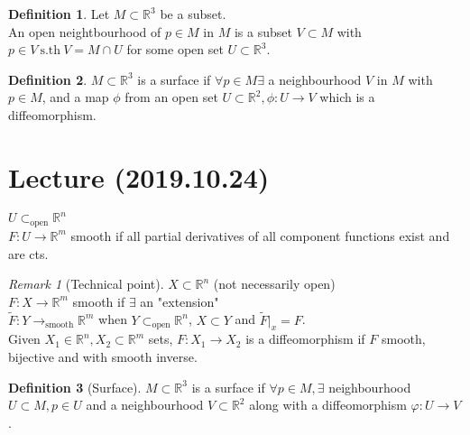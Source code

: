 \documentclass{article}
\newcommand{\sth}{\ \mathrm{s.th\ }}
\newcommand{\R}{\mathbb{R}}
\newcommand{\osub}{\subset_\mathrm{open}}
\theoremstyle{definition}
\newtheorem{definition}{Definition}[section]
\theoremstyle{remark}
\theoremstyle{example}
\newtheorem*{remark}{Remark}
\begin{document}
	\begin{definition}
		Let $M \subset \R^3$ be a subset.\\
		An open neightbourhood of $p \in M$ in $M$ is a subset $V \subset M$ with $p \in V \sth V=M \cap U$ for some open set $U \subset \R^3$.
	\end{definition}

	\begin{definition}
		$M \subset \R^3$ is a surface if $\forall p \in M \exists$ a neighbourhood $V$ in $M$ with $p \in M$, and a map $\phi$ from an open set $U \subset \R^2, \phi:U \to V$ which is a diffeomorphism.
	\end{definition}

	\section*{Lecture (2019.10.24)}
	$U \osub \R^n$\\
	$F:U \to \R^m$ smooth if all partial derivatives of all component functions exist and are cts.
	\begin{remark}[Technical point]
		$X \subset \R^n$ (not necessarily open)\\
		$F:X \to \R^m$ smooth if $\exists$ an "extension"\\
		$\tilde{F}:Y \to_\mathrm{smooth} \R^m$ when $Y \osub \R^n$, $X \subset Y$ and $\tilde{F}|_x=F$.\\
		Given $X_1 \in \R^n, X_2 \subset \R^m$ sets, $F:X_1 \to X_2$ is a diffeomorphism if $F$ smooth, bijective and with smooth inverse.
	\end{remark}

	\begin{definition}[Surface]
		$M \subset \R^3$ is a surface if $\forall p \in M, \exists $ neighbourhood $U \subset M, p \in U $ and a neighbourhood $V \subset \R^2$ along with a diffeomorphism $\varphi : U \to V$.
	\end{definition}
\end{document}
